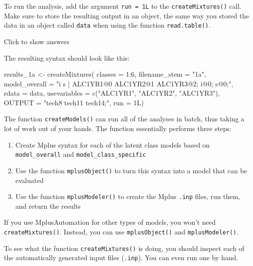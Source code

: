 \documentclass[
]{book}
\newenvironment{Shaded}{\begin{snugshade}}{\end{snugshade}}
\newcommand{\AttributeTok}[1]{\textcolor[rgb]{0.77,0.63,0.00}{#1}}
\newcommand{\DecValTok}[1]{\textcolor[rgb]{0.00,0.00,0.81}{#1}}
\newcommand{\FunctionTok}[1]{\textcolor[rgb]{0.00,0.00,0.00}{#1}}
\newcommand{\NormalTok}[1]{#1}
\newcommand{\OtherTok}[1]{\textcolor[rgb]{0.56,0.35,0.01}{#1}}
\newcommand{\SpecialCharTok}[1]{\textcolor[rgb]{0.00,0.00,0.00}{#1}}
\newcommand{\StringTok}[1]{\textcolor[rgb]{0.31,0.60,0.02}{#1}}
\providecommand{\tightlist}{%
  \setlength{\itemsep}{0pt}\setlength{\parskip}{0pt}}
\begin{document}
To run the analysis, add the argument \texttt{run\ =\ 1L} to the \texttt{createMixtures()} call.
Make sure to store the resulting output in an object, the same way you stored the data in an object called \texttt{data} when using the function \texttt{read.table()}.

Click to show answers

The resulting syntax should look like this:

\begin{Shaded}
\begin{Highlighting}[]
\NormalTok{results\_1a }\OtherTok{\textless{}{-}} \FunctionTok{createMixtures}\NormalTok{(}
  \AttributeTok{classes =} \DecValTok{1}\SpecialCharTok{:}\DecValTok{6}\NormalTok{,}
  \AttributeTok{filename\_stem =} \StringTok{"1a"}\NormalTok{,}
  \AttributeTok{model\_overall =} \StringTok{"i s | ALC1YR1@0 ALC1YR2@1 ALC1YR3@2;}
\StringTok{                   i@0;  s@0;"}\NormalTok{,}
  \AttributeTok{rdata =}\NormalTok{ data, }
  \AttributeTok{usevariables =} \FunctionTok{c}\NormalTok{(}\StringTok{"ALC1YR1"}\NormalTok{, }\StringTok{"ALC1YR2"}\NormalTok{, }\StringTok{"ALC1YR3"}\NormalTok{),}
  \AttributeTok{OUTPUT =} \StringTok{"tech8 tech11 tech14;"}\NormalTok{,}
  \AttributeTok{run =}\NormalTok{ 1L)}
\end{Highlighting}
\end{Shaded}

The function \texttt{createModels()} can run all of the analyses in batch, thus taking a lot of work out of your hands.
The function essentially performs three steps:

\begin{enumerate}
\def\labelenumi{\arabic{enumi}.}
\tightlist
\item
  Create Mplus syntax for each of the latent class models based on \texttt{model\_overall} and \texttt{model\_class\_specific}
\item
  Use the function \texttt{mplusObject()} to turn this syntax into a model that can be evaluated
\item
  Use the function \texttt{mplusModeler()} to create the Mplus \texttt{.inp} files, run them, and return the results
\end{enumerate}

If you use MplusAutomation for other types of models, you won't need \texttt{createMixtures()}. Instead, you can use \texttt{mplusObject()} and \texttt{mplusModeler()}.

To see what the function \texttt{createMixtures()} is doing, you should inspect each of the automatically generated input files (\texttt{.inp}). You can even run one by hand.
\end{document}

